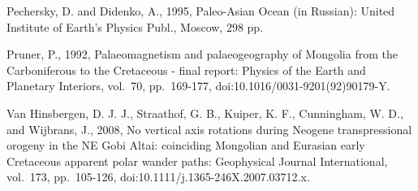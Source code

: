 \documentclass[11pt]{article}
\begin{document}
Pechersky, D. and Didenko, A., 1995, Paleo-Asian Ocean (in Russian):
United Institute of Earth's Physics Publ., Moscow, 298 pp.

Pruner, P., 1992, Palaeomagnetism and palaeogeography of Mongolia from
the Carboniferous to the Cretaceous - final report: Physics of the Earth
and Planetary Interiors, vol.~70, pp.~169-177,
doi:10.1016/0031-9201(92)90179-Y.

Van Hinsbergen, D. J. J., Straathof, G. B., Kuiper, K. F., Cunningham,
W. D., and Wijbrans, J., 2008, No vertical axis rotations during Neogene
transpressional orogeny in the NE Gobi Altai: coinciding Mongolian and
Eurasian early Cretaceous apparent polar wander paths: Geophysical
Journal International, vol.~173, pp.~105-126,
doi:10.1111/j.1365-246X.2007.03712.x.



    
    
    
    
\end{document}
